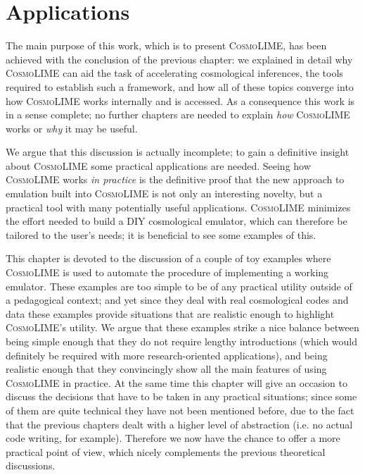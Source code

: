 \chapter{Applications}
The main purpose of this work, which is to present \textsc{CosmoLIME}, has been achieved with the conclusion of the previous chapter: we explained in detail why \textsc{CosmoLIME} can aid the task of accelerating cosmological inferences, the tools required to establish such a framework, and how all of these topics converge into how \textsc{CosmoLIME} works internally and is accessed. As a consequence this work is in a sense complete; no further chapters are needed to explain \emph{how} \textsc{CosmoLIME} works or \emph{why} it may be useful. 

We argue that this discussion is actually incomplete; to gain a definitive insight about \textsc{CosmoLIME} some practical applications are needed. Seeing how \textsc{CosmoLIME} works \emph{in practice} is the definitive proof that the new approach to emulation built into \textsc{CosmoLIME} is not only an interesting novelty, but a practical tool with many potentially useful applications. \textsc{CosmoLIME} minimizes the effort needed to build a DIY cosmological emulator, which can therefore be tailored to the user's needs; it is beneficial to see some examples of this.

This chapter is devoted to the discussion of a couple of toy examples where \textsc{CosmoLIME} is used to automate the procedure of implementing a working emulator. These examples are too simple to be of any practical utility outside of a pedagogical context; and yet since they deal with real cosmological codes and data these examples provide situations that are realistic enough to highlight \textsc{CosmoLIME}'s utility. We argue that these examples strike a nice balance between being simple enough that they do not require lengthy introductions (which would definitely be required with more research-oriented applications), and being realistic enough that they convincingly show all the main features of using \textsc{CosmoLIME} in practice.
At the same time this chapter will give an occasion to discuss the decisions that have to be taken in any practical situations; since some of them are quite technical they have not been mentioned before, due to the fact that the previous chapters dealt with a higher level of abstraction (i.e. no actual code writing, for example). Therefore we now have the chance to offer a more practical point of view, which nicely complements the previous theoretical discussions.

